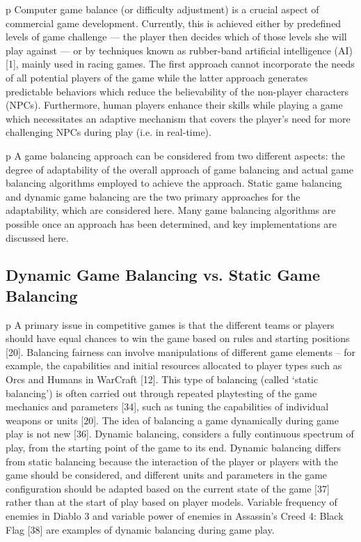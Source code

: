 \documentclass{uofsthesis-cs}
\begin{document}
p Computer game balance (or difficulty adjustment) is a crucial aspect of commercial game development. Currently, this is achieved either by predefined levels of game challenge — the player then decides which of those levels she will play against — or by techniques known as rubber-band artificial intelligence (AI) [1], mainly used in racing games. The first approach cannot incorporate the needs of all potential players of the game while the latter approach generates predictable behaviors which reduce the believability of the non-player characters (NPCs). Furthermore, human players enhance their skills while playing a game which necessitates an adaptive mechanism that covers the player’s need for more challenging NPCs during play (i.e. in real-time).

p A game balancing approach can be considered from two different aspects: the degree of adaptability of the overall approach of game balancing and actual game balancing algorithms employed to achieve the approach. Static game balancing and dynamic game balancing are the two primary approaches for the adaptability, which are considered here. Many game balancing algorithms are possible once an approach has been determined, and key implementations are discussed here.  

\subsection{Dynamic Game Balancing vs. Static Game Balancing }
p A primary issue in competitive games is that the different teams or players should have equal chances to win the game based on rules and starting positions [20]. Balancing fairness can involve manipulations of different game elements – for example, the capabilities and initial resources allocated to player types such as Orcs and Humans in WarCraft [12]. This type of balancing (called ‘static balancing’) is often carried out through repeated playtesting of the game mechanics and parameters [34], such as tuning the capabilities of individual weapons or units [20].  The idea of balancing a game dynamically during game play is not new [36]. Dynamic balancing, considers a fully continuous spectrum of play, from the starting point of the game to its end. Dynamic balancing differs from static balancing because the interaction of the player or players with the game should be considered, and different units and parameters in the game configuration should be adapted based on the current state of the game [37] rather than at the start of play based on player models. Variable frequency of enemies in Diablo 3 and variable power of enemies in Assassin’s Creed 4: Black Flag [38] are examples of dynamic balancing during game play. 
\end{document}
